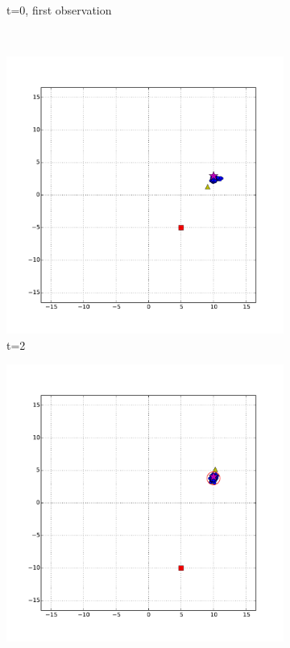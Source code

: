 \begin{figure}
\begin{subfigure}[b]{0.3\textwidth}
                \caption{t=0, first observation}
                \label{fig:bad_range_t_0}
        \end{subfigure}
        ~ %
        \begin{subfigure}[b]{0.3\textwidth}
                \includegraphics[width=\textwidth]{bad_range_t_2}
                \caption{t=2}
                \label{fig:bad_range_t_2}
        \end{subfigure}
        \begin{subfigure}[b]{0.3\textwidth}
                \includegraphics[width=\textwidth]{bad_range_t_3}

\end{subfigure}
\end{figure}
